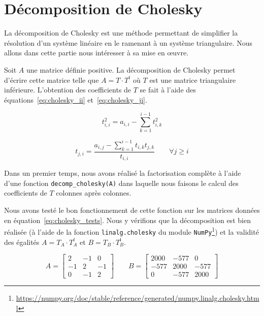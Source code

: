 \documentclass{article}
\begin{document}
\section{Décomposition de Cholesky}
\label{sec:decomposition_cholesky}

La décomposition de Cholesky est une méthode permettant de simplifier la résolution d'un système linéaire en le ramenant à un système triangulaire. Nous allons dans cette partie nous intéresser à sa mise en œuvre.
\vskip 1mm ~

Soit $A$ une matrice définie positive. La décomposition de Cholesky permet d'écrire cette matrice telle que $A = T\cdot T^t$ où $T$ est une matrice triangulaire inférieure. L'obtention des coefficients de $T$ se fait à l'aide des équations~\ref{eq:cholesky_ii} et~\ref{eq:cholesky_ji}.

\begin{equation}
  t_{i,i}^2 = a_{i,i} - \sum_{k=1}^{i-1}t_{i,k}^2
  \label{eq:cholesky_ii}
\end{equation}

\begin{equation}
  t_{j,i} = \frac{a_{i,j}-\sum_{k=1}^{i-1}t_{i,k}t_{j,k}}{t_{i,i}} \qquad\forall j\geq i
  \label{eq:cholesky_ji}
\end{equation}

Dans un premier temps, nous avons réalisé la factorisation complète à l'aide d'une fonction \verb|decomp_cholesky(A)| dans laquelle nous faisons le calcul des coefficients de $T$ colonnes après colonnes.

Nous avons testé le bon fonctionnement de cette fonction sur les matrices données en équation~\ref{eq:cholesky_tests}. Nous y vérifions que la décomposition est bien réalisée (à l'aide de la fonction \verb|linalg.cholesky| du module \verb|NumPy|\footnote{\url{https://numpy.org/doc/stable/reference/generated/numpy.linalg.cholesky.html}}) et la validité des égalités $A = T_A\cdot T_A^t$ et $B = T_B\cdot T_B^t$.

\begin{equation}
  A = 
  \begin{bmatrix}
    2 & -1 & 0\\
    -1 & 2 & -1\\
    0 & -1 & 2
  \end{bmatrix}
  \qquad
  B = 
  \begin{bmatrix}
    2000 & -577 & 0\\
    -577 & 2000 & -577\\
    0 & -577 & 2000
  \end{bmatrix}
  \label{eq:cholesky_tests}
\end{equation}
\end{document}
